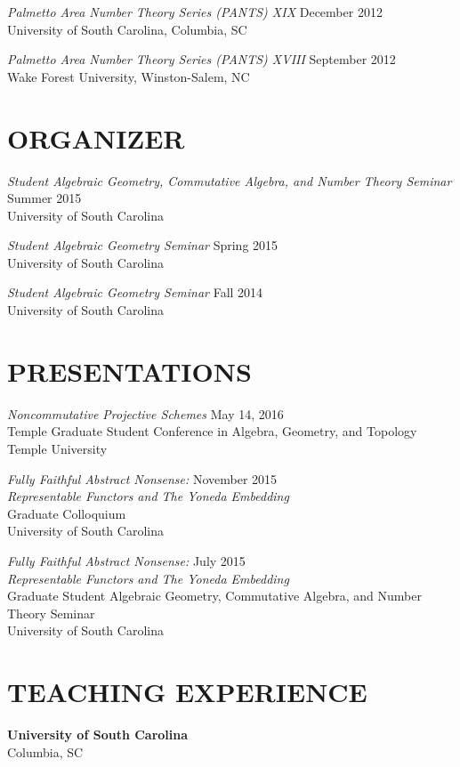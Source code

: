 \documentclass[line,overlapped]{res}
\begin{document}
\begin{resume}
         {\sl Palmetto Area Number Theory Series (PANTS) XIX} \hfill December 2012\\
         University of South Carolina, Columbia, SC

         {\sl Palmetto Area Number Theory Series (PANTS) XVIII} \hfill September 2012\\
         Wake Forest University, Winston-Salem, NC

 \section{ORGANIZER}
	 {\sl Student Algebraic Geometry, Commutative Algebra, and Number Theory Seminar} \hfill Summer 2015\\
	 University of South Carolina
	 
         {\sl Student Algebraic Geometry Seminar} \hfill Spring 2015\\
	 University of South Carolina

         {\sl Student Algebraic Geometry Seminar} \hfill Fall 2014\\
	 University of South Carolina
        
         \newpage

 \section{PRESENTATIONS}
         {\sl Noncommutative Projective Schemes} \hfill May 14, 2016\\
         Temple Graduate Student Conference in Algebra, Geometry, and Topology
         Temple University

         {\sl Fully Faithful Abstract Nonsense:} \hfill November 2015\\
         {\sl Representable Functors and The Yoneda Embedding}\\
         Graduate Colloquium\\
         University of South Carolina

         {\sl Fully Faithful Abstract Nonsense:} \hfill July 2015\\
         {\sl Representable Functors and The Yoneda Embedding}\\
         Graduate Student Algebraic Geometry, Commutative Algebra, and Number Theory Seminar\\
         University of South Carolina

 \section{TEACHING EXPERIENCE}
         {\bf University of South Carolina}\\Columbia, SC
         

\end{resume}
\end{document}
